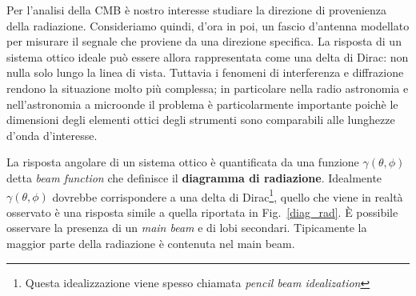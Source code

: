 \documentclass[12pt,a4paper,final]{book}
\begin{document}
Per l'analisi della CMB è nostro interesse studiare la direzione di provenienza della radiazione. Consideriamo quindi, d'ora in poi, un fascio d'antenna modellato per misurare il segnale che proviene da una direzione specifica.
La risposta di un sistema ottico ideale può essere allora rappresentata come una delta di Dirac: non nulla solo lungo la linea di vista.
Tuttavia i fenomeni di interferenza e diffrazione rendono la situazione molto più complessa; in particolare nella radio astronomia e nell'astronomia a microonde il problema è particolarmente importante poichè le dimensioni degli elementi ottici degli strumenti sono comparabili alle lunghezze d'onda d'interesse.


La risposta angolare di un sistema ottico è quantificata da una funzione $\gamma(\theta,\phi)$ detta \textit{beam function} che definisce il \textbf{diagramma di radiazione}. Idealmente $\gamma(\theta,\phi)$ dovrebbe corrispondere a una delta di Dirac\footnote{Questa idealizzazione viene spesso chiamata \textit{pencil beam idealization}}, quello che viene in realtà osservato è una risposta simile a quella riportata in Fig.~\ref{diag_rad}.
\`E possibile osservare la presenza di un \textit{main beam} e di lobi secondari. Tipicamente la maggior parte della radiazione è contenuta nel main beam.
\end{document}
